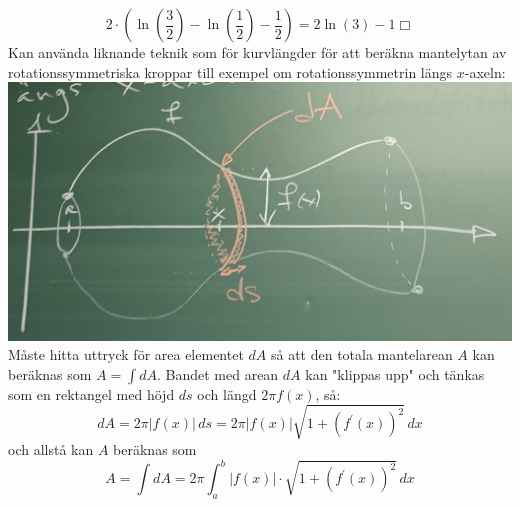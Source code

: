 \begin{equation*}
    2\cdot(\ln(\frac{3}{2})-\ln(\frac{1}{2})-\frac{1}{2})=
    2\ln(3)-1 \Box
\end{equation*}
Kan använda liknande teknik som för kurvlängder för att beräkna mantelytan av rotationssymmetriska kroppar till exempel om rotationssymmetrin längs $x$-axeln:\\
\includegraphics[scale=0.1]{lessons/lesson19/imgs/img12.jpg}\\
Måste hitta uttryck för area elementet $dA$ så att den totala mantelarean $A$ kan beräknas som $A=\int dA$.
Bandet med arean $dA$ kan "klippas upp" och tänkas som en rektangel med höjd $ds$ och längd $2\pi f(x)$, så:
\begin{equation*}
    dA=2\pi|f(x)|\, ds=
    2\pi|f(x)|\sqrt{1+(f^\prime(x))^2}\, dx
\end{equation*}
och allstå kan $A$ beräknas som
\begin{equation*}
    A=\int dA=2\pi\int_a^b|f(x)|\cdot\sqrt{1+(f^\prime(x))^2}\, dx
\end{equation*}